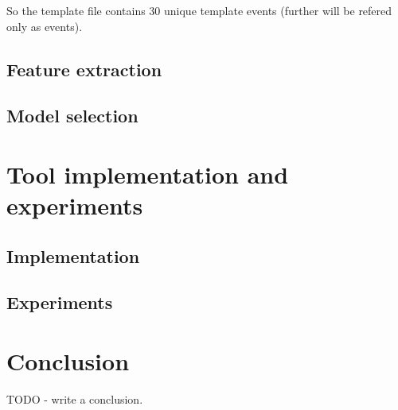 So the template file contains 30 unique template events (further will be refered only as events).



\section{Feature extraction}

\section{Model selection} \label{model}

\chapter{Tool implementation and experiments}

\section{Implementation}

\section{Experiments}

\chapter{Conclusion}

TODO - write a conclusion.


% 